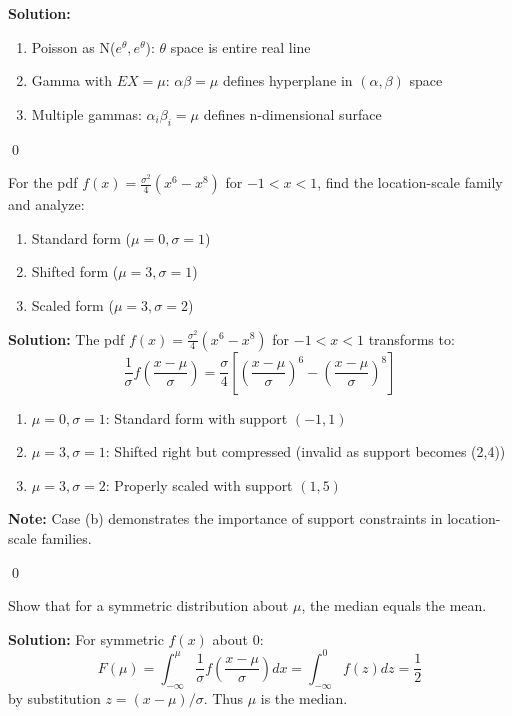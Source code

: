 \noindent\textbf{Solution:}
\begin{enumerate}[label=(\alph*)]
\item Poisson as N($e^\theta,e^\theta$): $\theta$ space is entire real line

\item Gamma with $EX = \mu$: $\alpha\beta = \mu$ defines hyperplane in $(\alpha,\beta)$ space

\item Multiple gammas: $\alpha_i\beta_i = \mu$ defines n-dimensional surface
\end{enumerate}


\qed
\begin{problembox}
For the pdf $f(x) = \frac{\sigma^2}{4}(x^6 - x^8)$ for $-1 < x < 1$, find the location-scale family and analyze:
\begin{enumerate}[label=(\alph*)]
\item Standard form ($\mu=0,\sigma=1$)
\item Shifted form ($\mu=3,\sigma=1$)
\item Scaled form ($\mu=3,\sigma=2$)
\end{enumerate}
\end{problembox}

\noindent\textbf{Solution:}
The pdf $f(x) = \frac{\sigma^2}{4}(x^6 - x^8)$ for $-1 < x < 1$ transforms to:
\[
\frac{1}{\sigma}f\left(\frac{x-\mu}{\sigma}\right) = \frac{\sigma}{4}\left[\left(\frac{x-\mu}{\sigma}\right)^6 - \left(\frac{x-\mu}{\sigma}\right)^8\right]
\]
\begin{enumerate}[label=(\alph*)]
\item $\mu=0,\sigma=1$: Standard form with support $(-1,1)$
\item $\mu=3,\sigma=1$: Shifted right but compressed (invalid as support becomes (2,4))
\item $\mu=3,\sigma=2$: Properly scaled with support $(1,5)$
\end{enumerate}
\textbf{Note:} Case (b) demonstrates the importance of support constraints in location-scale families.


\qed
\begin{problembox}
Show that for a symmetric distribution about $\mu$, the median equals the mean.
\end{problembox}

\noindent\textbf{Solution:}
For symmetric $f(x)$ about 0:
\[
F(\mu) = \int_{-\infty}^\mu \frac{1}{\sigma}f\left(\frac{x-\mu}{\sigma}\right)dx = \int_{-\infty}^0 f(z)dz = \frac{1}{2}
\]
by substitution $z = (x-\mu)/\sigma$. Thus $\mu$ is the median.



